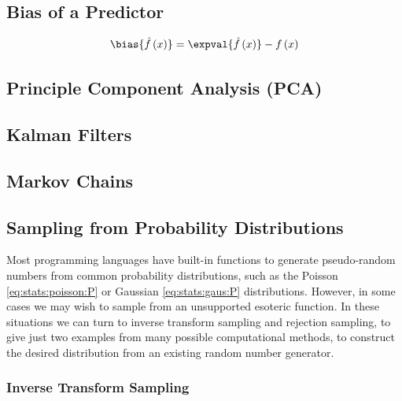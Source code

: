\subsection{Bias of a Predictor}
\label{additional:stats:bias}

\begin{equation}\label{eq:stats:bias}
\bias{\hat{f}\left(x\right)} = \expval{\hat{f}\left(x\right)} - f\left(x\right)
\end{equation}

\subsection{Principle Component Analysis (PCA)}
\label{additional:stats:PCA}

\subsection{Kalman Filters}
\label{additional:misc:kalman_filters}

\subsection{Markov Chains}
\label{additional:misc:markov_chains}

\subsection{Sampling from Probability Distributions}
\label{additional:misc:sampling_prob_dist}

Most programming languages have built-in functions to generate
pseudo-random numbers from common probability distributions,
such as the Poisson \cref{eq:stats:poisson:P} or Gaussian \cref{eq:stats:gaus:P} distributions.
However, in some cases we may wish to sample from an unsupported esoteric function.
In these situations we can turn to inverse transform sampling and rejection sampling,
to give just two examples from many possible computational methods,
to construct the desired distribution from an existing random number generator.

\subsubsection{Inverse Transform Sampling}
\label{additional:misc:sampling_prob_dist:inverse}

